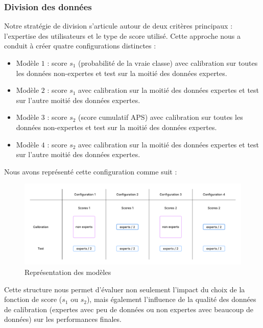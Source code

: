 \documentclass[a4paper,12pt]{article}
\begin{document}
\subsubsection{Division des données}

Notre stratégie de division s'articule autour de deux critères principaux : l'expertise des utilisateurs et le type de score utilisé. Cette approche nous a conduit à créer quatre configurations distinctes : 
\begin{itemize}
    \item Modèle $1$ : score $s_1$ (probabilité de la vraie classe) avec calibration sur toutes les données non-expertes et test sur la moitié des données expertes.
    \item Modèle $2$ : score $s_1$ avec calibration sur la moitié des données expertes et test sur l'autre moitié des données expertes.
    \item Modèle $3$ : score $s_2$ (score cumulatif APS) avec calibration sur toutes les données non-expertes et test sur la moitié des données expertes.
    \item Modèle $4$ : score $s_2$ avec calibration sur la moitié des données expertes et test sur l'autre moitié des données expertes.
\end{itemize}

\vspace{0.2cm}

Nous avons représenté cette configuration comme suit : 
\begin{figure}[H]
    \centering
    \includegraphics[scale=0.6]{images/Models.png}
    \caption{Représentation des modèles}
    \label{models}
  \end{figure}

\vspace{0.2cm}

Cette structure nous permet d'évaluer non seulement l'impact du choix de la fonction de score ($s_1$ ou $s_2$), mais également l'influence de la qualité des données de calibration (expertes avec peu de données ou non expertes avec beaucoup de données) sur les performances finales.
\end{document}
